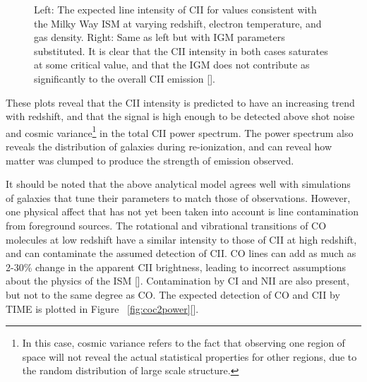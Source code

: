 \documentclass[manuscript]{aastex}
\begin{document}
\begin{figure}[H]%
    \centering
    \qquad
    \singlespace
    \caption[Calculated line intensities for CII in the ISM and IGM. -(\cite{Gong2012})]{Left: The expected line intensity of CII for values consistent with the Milky Way ISM at varying redshift, electron temperature, and gas density. Right: Same as left but with IGM parameters substituted. It is clear that the CII intensity in both cases saturates at some critical value, and that the IGM does not contribute as significantly to the overall CII emission [\cite{Gong2012}].}%
    \label{fig:gong1}%
    \vspace{-0.8cm}
\end{figure}

These plots reveal that the CII intensity is predicted to have an increasing trend with redshift, and that the signal is high enough to be detected above shot noise and cosmic variance\footnote{In this case, cosmic variance refers to the fact that observing one region of space will not reveal the actual statistical properties for other regions, due to the random distribution of large scale structure.} in the total CII power spectrum. The power spectrum also reveals the distribution of galaxies during re-ionization, and can reveal how matter was clumped to produce the strength of emission observed. 

It should be noted that the above analytical model agrees well with simulations of galaxies that tune their parameters to match those of observations. However, one physical affect that has not yet been taken into account is line contamination from foreground sources. The rotational and vibrational transitions of CO molecules at low redshift have a similar intensity to those of CII at high redshift, and can contaminate the assumed detection of CII. CO lines  can add as much as 2-30\% change in the apparent CII brightness, leading to incorrect assumptions about the physics of the ISM [\cite{Gong2012}]. Contamination by CI and NII are also present, but not to the same degree as CO. The expected detection of CO and CII by TIME is plotted in Figure ~\ref{fig:coc2power}[\cite{Crites2014}].
\end{document}
